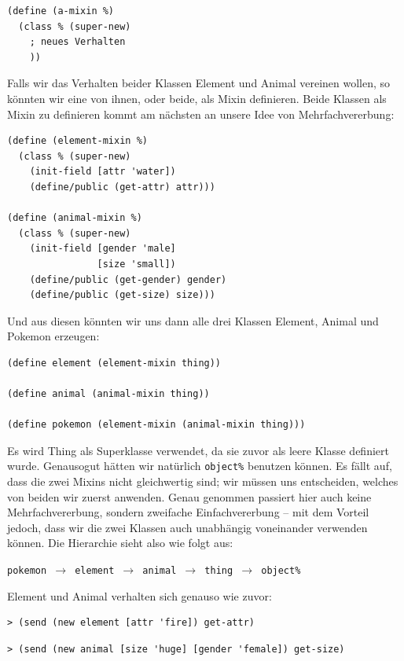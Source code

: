 \begin{lstlisting}
(define (a-mixin %)
  (class % (super-new)
    ; neues Verhalten
    ))
\end{lstlisting}

Falls wir das Verhalten beider Klassen Element und Animal vereinen wollen, so könnten wir eine von ihnen, oder beide, als Mixin definieren. Beide Klassen als Mixin zu definieren kommt am nächsten an unsere Idee von Mehrfachvererbung:

\begin{lstlisting}
(define (element-mixin %)
  (class % (super-new)
    (init-field [attr 'water])
    (define/public (get-attr) attr)))

(define (animal-mixin %)
  (class % (super-new)
    (init-field [gender 'male]
                [size 'small])
    (define/public (get-gender) gender)
    (define/public (get-size) size)))
\end{lstlisting}

Und aus diesen könnten wir uns dann alle drei Klassen Element, Animal und Pokemon erzeugen:
\begin{lstlisting}
(define element (element-mixin thing))

(define animal (animal-mixin thing))
 
(define pokemon (element-mixin (animal-mixin thing)))
\end{lstlisting}

Es wird Thing als Superklasse verwendet, da sie zuvor als leere Klasse definiert wurde. Genausogut hätten wir natürlich \texttt{object\%} benutzen können. Es fällt auf, dass die zwei Mixins nicht gleichwertig sind; wir müssen uns entscheiden, welches von beiden wir zuerst anwenden. Genau genommen passiert hier auch keine Mehrfachvererbung, sondern zweifache Einfachvererbung -- mit dem Vorteil jedoch, dass wir die zwei Klassen auch unabhängig voneinander verwenden können. Die Hierarchie sieht also wie folgt aus:

\texttt{pokemon $\rightarrow$ element $\rightarrow$ animal $\rightarrow$ thing $\rightarrow$ object\%}

Element und Animal verhalten sich genauso wie zuvor:

\begin{lstlisting}
> (send (new element [attr 'fire]) get-attr)
\end{lstlisting} 
{}

\begin{lstlisting}
> (send (new animal [size 'huge] [gender 'female]) get-size)
\end{lstlisting} 
{}

